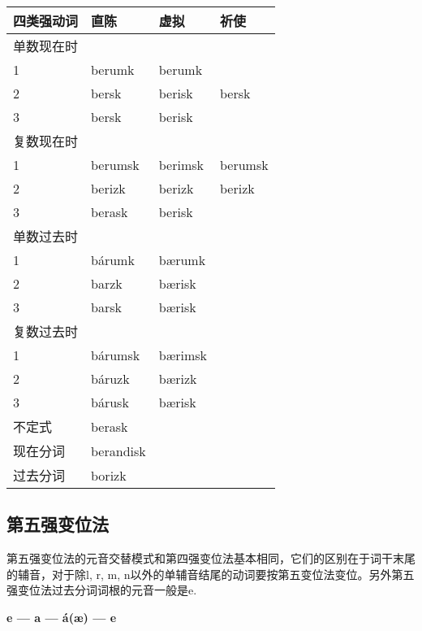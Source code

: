 \begin{longtable}{llll}
    \toprule
    四类强动词 & 直陈      & 虚拟    & 祈使    \\
    \midrule
    \endhead
    \bottomrule
    \endfoot
    单数现在时 &           &         &         \\
    1          & berumk    & berumk  &         \\
    2          & bersk     & berisk  & bersk   \\
    3          & bersk     & berisk  &         \\
    复数现在时 &           &         &         \\
    1          & berumsk   & berimsk & berumsk \\
    2          & berizk    & berizk  & berizk  \\
    3          & berask    & berisk  &         \\
    单数过去时 &           &         &         \\
    1          & bárumk    & bærumk  &         \\
    2          & barzk     & bærisk  &         \\
    3          & barsk     & bærisk  &         \\
    复数过去时 &           &         &         \\
    1          & bárumsk   & bærimsk &         \\
    2          & báruzk    & bærizk  &         \\
    3          & bárusk    & bærisk  &         \\
    不定式     & berask    &         &         \\
    现在分词   & berandisk &         &         \\
    过去分词   & borizk    &         &         \\
\end{longtable}

\subsection{第五强变位法}\label{第五强变位法}

第五强变位法的元音交替模式和第四强变位法基本相同，它们的区别在于词干末尾的辅音，对于除l, r, m, n以外的单辅音结尾的动词要按第五变位法变位。另外第五强变位法过去分词词根的元音一般是e.

\begin{center}
    \textbf{e --- a --- á(æ) --- e}
\end{center}


